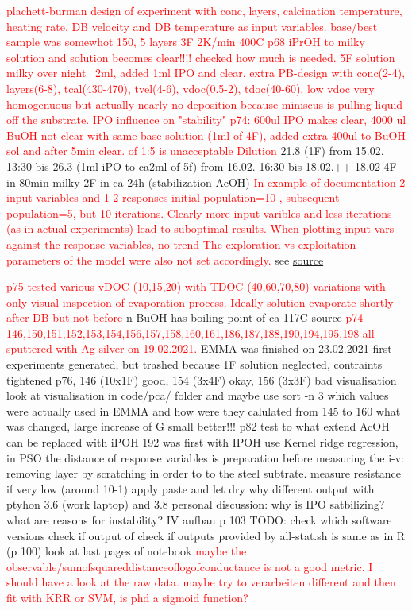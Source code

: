 \documentclass[a4paper]{article}
\newcommand{\td}[1]{\textcolor{red}{#1}}
\begin{document}
\td{plachett-burman design of experiment with conc, layers, calcination temperature, 
heating rate, DB velocity and DB temperature as input variables.}
\td{base/best sample was somewhot 150, 5 layers 3F 2K/min 400C}
\td{p68 iPrOH to milky solution and solution becomes clear!!!! checked how much 
is needed. 5F solution milky over night ~2ml, added 1ml IPO and clear.}
\td{extra PB-design with conc(2-4), layers(6-8), tcal(430-470), tvel(4-6),
vdoc(0.5-2), tdoc(40-60). low vdoc very homogenuous but actually nearly no 
deposition because miniscus is pulling liquid off the substrate.}
\td{IPO influence on "stability" p74: 600ul IPO makes clear, 4000 ul BuOH not clear with 
same base solution (1ml of 4F), added extra 400ul to BuOH sol and after 5min clear. 
of 1:5 is unacceptable Dilution }
21.8 (1F) from 15.02. 13:30 bis 
26.3 (1ml iPO to ca2ml of 5f) from 16.02. 16:30 bis 18.02.++
18.02 4F in 80min milky
      2F in ca 24h (stabilization AcOH)
\td{In example of documentation 2 input variables and 1-2 responses initial population=10
, subsequent population=5, but 10 iterations. Clearly more input varibles and less 
iterations (as in actual experiments) lead to suboptimal results.
When plotting input vars  against the response variables, no trend
The exploration-vs-exploitation parameters of the model were also not set accordingly.}
see \href{https://search.r-project.org/CRAN/refmans/emma/html/emma.html}{source}

\td{p75 tested various vDOC (10,15,20) with TDOC (40,60,70,80) variations with only visual 
inspection of evaporation process. Ideally solution evaporate shortly after DB but not 
before} 
n-BuOH has boiling point of ca 117C 
\href{https://pubchem.ncbi.nlm.nih.gov/compound/1-butanol#section=Boiling-Point}{source}
\td{p74 146,150,151,152,153,154,156,157,158,160,161,186,187,188,190,194,195,198 
all sputtered with Ag silver on 19.02.2021.}
EMMA was finished on 23.02.2021
first experiments generated, but trashed because 1F solution neglected, contraints 
tightened
p76, 146 (10x1F) good, 154 (3x4F) okay, 156 (3x3F) bad visualisation
look at visualisation in code/pca/ folder and maybe use sort -n 3 
which values were actually used in EMMA and how were they calulated
from 145 to 160 what was changed, large increase of G
small better!!!
p82 test to what extend AcOH can be replaced with iPOH
192 was first with IPOH
use Kernel ridge regression, in PSO the distance of response variables is 
preparation before measuring the i-v: removing layer by scratching in order to to the 
steel subtrate. measure resistance if very low (around 10-1) apply paste and let dry
why different output with ptyhon 3.6 (work laptop) and 3.8 personal
discussion: 
why is IPO satbilizing? 
what are reasons for instability? 
IV aufbau p 103 
TODO: check which software versions
check if output of 
check if outputs provided by all-stat.sh is same as in R  (p 100)
look at last pages of notebook
\td{maybe the observable/sumofsquareddistanceoflogofconductance is not a good metric.
I should have a look at the raw data. maybe try to verarbeiten different and then fit 
with KRR or SVM, is phd a sigmoid function? }
\end{document}

